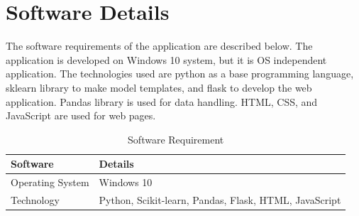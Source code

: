 \section{Software Details} \label{sec:software_details}
The software requirements of the application are described below. The application is developed
on Windows 10 system, but it is OS independent application. The technologies used are python as
a base programming language, sklearn library to make model templates, and flask to develop the
web application. Pandas library is used for data handling. HTML, CSS, and JavaScript are used
for web pages.

\begin{table}[H]
    \centering
    \caption{Software Requirement} \label{tab:software_requirement}
        \begin{tabular}{|L{10em}|L{25em}|}
        \hline
        \textbf{Software} & \textbf{Details}
        \rule[-3ex]{0pt}{6ex}\\\hline
        Operating System & Windows 10
        \rule[-2ex]{0pt}{4ex}\\\hline
        Technology & Python, Scikit-learn, Pandas, Flask, HTML, JavaScript
        \rule[-2ex]{0pt}{4ex}\\\hline
    \end{tabular}
\end{table}